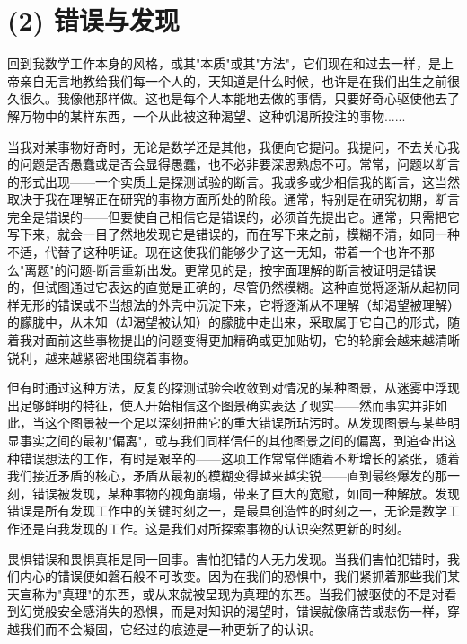 \section{(2) 错误与发现}

回到我数学工作本身的风格，或其"本质"或其"方法"，它们现在和过去一样，是上帝亲自无言地教给我们每一个人的，天知道是什么时候，也许是在我们出生之前很久很久。我像他那样做。这也是每个人本能地去做的事情，只要好奇心驱使他去了解万物中的某样东西，一个从此被这种渴望、这种饥渴所投注的事物......

当我对某事物好奇时，无论是数学还是其他，我便向它提问。我提问，不去关心我的问题是否愚蠢或是否会显得愚蠢，也不必非要深思熟虑不可。常常，问题以断言的形式出现——一个实质上是探测试验的断言。我或多或少相信我的断言，这当然取决于我在理解正在研究的事物方面所处的阶段。通常，特别是在研究初期，断言完全是错误的——但要使自己相信它是错误的，必须首先提出它。通常，只需把它写下来，就会一目了然地发现它是错误的，而在写下来之前，模糊不清，如同一种不适，代替了这种明证。现在这使我们能够少了这一无知，带着一个也许不那么"离题"的问题-断言重新出发。更常见的是，按字面理解的断言被证明是错误的，但试图通过它表达的直觉是正确的，尽管仍然模糊。这种直觉将逐渐从起初同样无形的错误或不当想法的外壳中沉淀下来，它将逐渐从不理解（却渴望被理解）的朦胧中，从未知（却渴望被认知）的朦胧中走出来，采取属于它自己的形式，随着我对面前这些事物提出的问题变得更加精确或更加贴切，它的轮廓会越来越清晰锐利，越来越紧密地围绕着事物。

但有时通过这种方法，反复的探测试验会收敛到对情况的某种图景，从迷雾中浮现出足够鲜明的特征，使人开始相信这个图景确实表达了现实——然而事实并非如此，当这个图景被一个足以深刻扭曲它的重大错误所玷污时。从发现图景与某些明显事实之间的最初"偏离"，或与我们同样信任的其他图景之间的偏离，到追查出这种错误想法的工作，有时是艰辛的——这项工作常常伴随着不断增长的紧张，随着我们接近矛盾的核心，矛盾从最初的模糊变得越来越尖锐——直到最终爆发的那一刻，错误被发现，某种事物的视角崩塌，带来了巨大的宽慰，如同一种解放。发现错误是所有发现工作中的关键时刻之一，是最具创造性的时刻之一，无论是数学工作还是自我发现的工作。这是我们对所探索事物的认识突然更新的时刻。

畏惧错误和畏惧真相是同一回事。害怕犯错的人无力发现。当我们害怕犯错时，我们内心的错误便如磐石般不可改变。因为在我们的恐惧中，我们紧抓着那些我们某天宣称为"真理"的东西，或从来就被呈现为真理的东西。当我们被驱使的不是对看到幻觉般安全感消失的恐惧，而是对知识的渴望时，错误就像痛苦或悲伤一样，穿越我们而不会凝固，它经过的痕迹是一种更新了的认识。